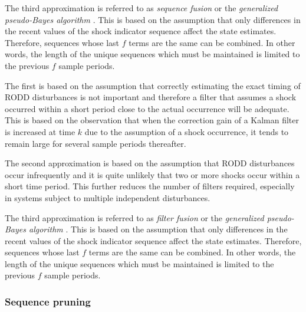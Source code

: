 The third approximation is referred to as \textit{sequence fusion} or the \textit{generalized pseudo-Bayes algorithm} \citep{jaffer_estimation_1971, buxbaum_recursive_1970, tugnait_detection_1982}. This is based on the assumption that only differences in the recent values of the shock indicator sequence affect the state estimates. Therefore, sequences whose last $f$ terms are the same can be combined. In other words, the length of the unique sequences which must be maintained is limited to the previous $f$ sample periods.

The first is based on the assumption that correctly estimating the exact timing of RODD disturbances is not important and therefore a filter that assumes a shock occurred within a short period close to the actual occurrence will be adequate. This is based on the observation that when the correction gain of a Kalman filter is increased at time $k$ due to the assumption of a shock occurrence, it tends to remain large for several sample periods thereafter.

The second approximation is based on the assumption that RODD disturbances occur infrequently and it is quite unlikely that two or more shocks occur within a short time period. This further reduces the number of filters required, especially in systems subject to multiple independent disturbances.

The third approximation is referred to as \textit{filter fusion} or the \textit{generalized pseudo-Bayes algorithm} \cite{jaffer_estimation_1971, buxbaum_recursive_1970, tugnait_detection_1982}. This is based on the assumption that only differences in the recent values of the shock indicator sequence affect the state estimates. Therefore, sequences whose last $f$ terms are the same can be combined. In other words, the length of the unique sequences which must be maintained is limited to the previous $f$ sample periods.

\subsubsection{Sequence pruning} \label{subsec-pruning}

